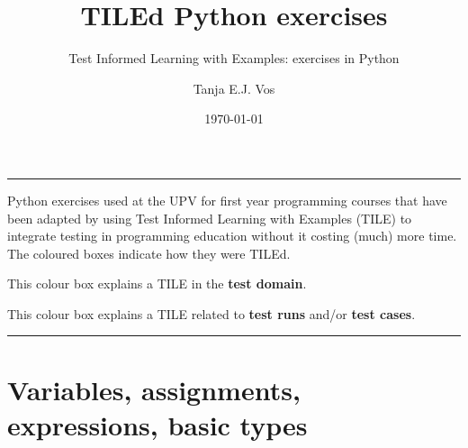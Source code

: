 \documentclass[
  fontsize=10pt,
  a4paper,
]{scrartcl}
\title{TILEd Python exercises}
\subtitle{Test Informed Learning with Examples: exercises in Python}
\author{Tanja E.J. Vos}
\date{\today}
\newenvironment{domainTILEd}%
  {\begin{mdframed}[skipabove=10pt,skipbelow=10pt,backgroundcolor=green!20]}%
  {\end{mdframed}}
\newenvironment{howTILEd}%
  {\begin{mdframed}[skipabove=10pt,skipbelow=10pt,backgroundcolor=pink!40]}%
  {\end{mdframed}}
\renewenvironment{abstract}{%
\vspace*{0.3cm}
  \hfill\begin{minipage}{\textwidth}
  \rule{\textwidth}{1pt}}
  {\par\noindent\rule{\textwidth}{1pt}\end{minipage}}
\begin{document}
\maketitle
\begin{abstract}
Python exercises used at the UPV for first year programming courses that have been adapted by using Test Informed Learning with Examples (TILE) to integrate testing in programming education without it costing (much) more time. The coloured boxes indicate how they were TILEd.

\begin{domainTILEd}
This colour box explains a TILE in the \textbf{test domain}.
\end{domainTILEd}

\begin{howTILEd}
This colour box explains a TILE related to \textbf{test runs}
and/or \textbf{test cases}.
\end{howTILEd}
\end{abstract}

\hypertarget{boletin2}{%
\section{Variables, assignments, expressions, basic types}\label{section.var-assign-expr-types}}
\end{document}
